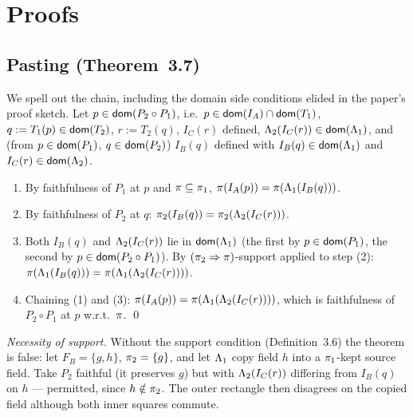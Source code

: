 
\section{Proofs}
\label{app:proofs}

\subsection{Pasting (Theorem~3.7)}

We spell out the chain, including the domain side conditions elided in
the paper's proof sketch. Let $p \in \mathsf{dom}(P_2 \circ P_1)$, i.e.\
$p \in \mathsf{dom}(I_A) \cap \mathsf{dom}(T_1)$, $q := T_1(p) \in \mathsf{dom}(T_2)$,
$r := T_2(q)$, $I_C(r)$ defined,
$\Lambda_2(I_C(r)) \in \mathsf{dom}(\Lambda_1)$, and (from $p \in \mathsf{dom}(P_1)$,
$q \in \mathsf{dom}(P_2)$) $I_B(q)$ defined with
$I_B(q) \in \mathsf{dom}(\Lambda_1)$ and $I_C(r) \in \mathsf{dom}(\Lambda_2)$.

\begin{enumerate}
\item By faithfulness of $P_1$ at $p$ and $\pi \subseteq \pi_1$,
  $\pi(I_A(p)) = \pi(\Lambda_1(I_B(q)))$.
\item By faithfulness of $P_2$ at $q$:
  $\pi_2(I_B(q)) = \pi_2(\Lambda_2(I_C(r)))$.
\item Both $I_B(q)$ and $\Lambda_2(I_C(r))$ lie in $\mathsf{dom}(\Lambda_1)$ (the
  first by $p \in \mathsf{dom}(P_1)$, the second by
  $p \in \mathsf{dom}(P_2 \circ P_1)$). By
  $(\pi_2 \Rightarrow \pi)$-support applied to step (2):
  $\pi(\Lambda_1(I_B(q))) = \pi(\Lambda_1(\Lambda_2(I_C(r))))$.
\item Chaining (1) and (3):
  $\pi(I_A(p)) = \pi(\Lambda_1(\Lambda_2(I_C(r))))$, which is
  faithfulness of $P_2 \circ P_1$ at $p$ w.r.t.\ $\pi$. \qed
\end{enumerate}

\emph{Necessity of support.} Without the support condition
(Definition~3.6) the theorem is
false: let $F_B = \{g, h\}$, $\pi_2 = \{g\}$, and let $\Lambda_1$ copy
field $h$ into a $\pi_1$-kept source field. Take $P_2$ faithful (it
preserves $g$) but with $\Lambda_2(I_C(r))$ differing from $I_B(q)$ on
$h$ --- permitted, since $h \notin \pi_2$. The outer rectangle then
disagrees on the copied field although both inner squares commute.

